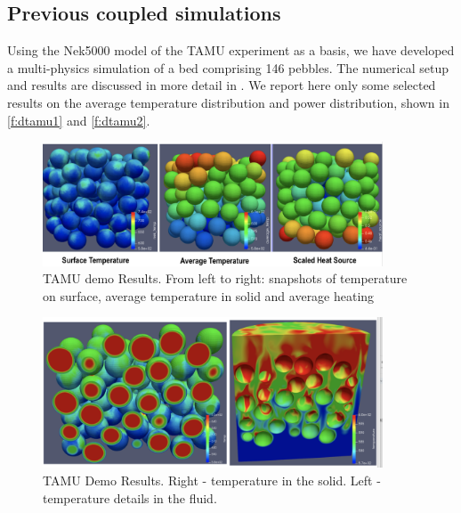 \subsection{Previous coupled simulations}
\label{ss:c4}

Using the Nek5000 model of the TAMU experiment as a basis, we have developed a multi-physics simulation of a bed comprising 146 pebbles.
The numerical setup and results are discussed in more detail in \cite{cardinal}.
We report here only some selected results on the average temperature distribution and power distribution, shown in \autoref{f:dtamu1} and \autoref{f:dtamu2}.

\begin{figure}[htb!]
\centering
\includegraphics[width=0.9\textwidth]{Figures/demo_r1}
\caption{TAMU demo Results. From left to right: snapshots of temperature on surface, average temperature in solid and average heating}
\label{f:dtamu1}
\end{figure}

\begin{figure}[htb!]
\centering
\includegraphics[width=0.9\textwidth]{Figures/demo_r2}
\caption{TAMU Demo Results. Right - temperature in the solid. Left - temperature details in the fluid.}
\label{f:dtamu2}
\end{figure}
